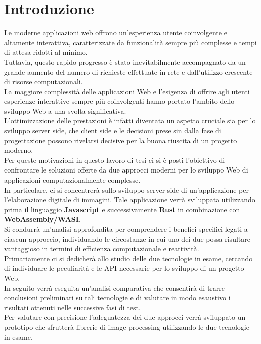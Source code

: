 \chapter*{Introduzione}
\label{Introduzione}
Le moderne applicazioni web offrono un'esperienza utente coinvolgente e altamente interattiva, caratterizzate da funzionalità sempre più complesse e tempi di attesa ridotti al minimo.
\\Tuttavia, questo rapido progresso è stato inevitabilmente accompagnato da un grande aumento del numero di richieste effettuate in rete e dall'utilizzo crescente di risorse computazionali.
\\La maggiore complessità delle applicazioni Web e l’esigenza di offrire agli utenti esperienze interattive sempre più coinvolgenti hanno portato l’ambito dello sviluppo Web a una svolta significativa.
\\L’ottimizzazione delle prestazioni è infatti diventata un aspetto cruciale sia per lo sviluppo server side, che client side e le decisioni prese sin dalla fase di progettazione possono rivelarsi decisive per la buona riuscita di un progetto moderno.
\\Per queste motivazioni in questo lavoro di tesi ci si è posti l'obiettivo di confrontare le soluzioni offerte da due approcci moderni per lo sviluppo Web di applicazioni computazionalmente complesse.
\\In particolare, ci si concentrerà sullo sviluppo server side di un'applicazione per l'elaborazione digitale di immagini.
Tale applicazione verrà sviluppata utilizzando prima il linguaggio \textbf{Javascript} e successivamente \textbf{Rust} in combinazione con \textbf{WebAssembly/WASI}.
\\Si condurrà un'analisi approfondita per comprendere i benefici specifici legati a ciascun approccio, individuando le circostanze in cui uno dei due possa risultare vantaggioso in termini di efficienza computazionale e reattività.
\\Primariamente ci si dedicherà allo studio delle due tecnologie in esame, cercando di individuare le peculiarità e le API necessarie per lo sviluppo di un progetto Web.
\\In seguito verrà eseguita un'analisi comparativa che consentirà di trarre conclusioni preliminari su tali tecnologie e di valutare in modo esaustivo i risultati ottenuti nelle successive fasi di test.
\\Per valutare con precisione l'adeguatezza dei due approcci verrà sviluppato un prototipo che sfrutterà librerie di image processing utilizzando le due tecnologie in esame.
